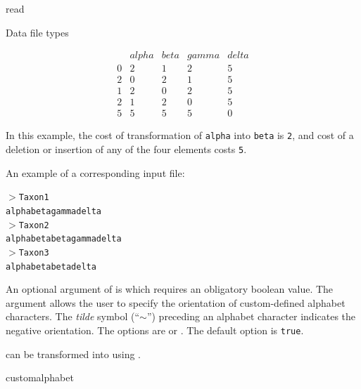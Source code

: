 \begin{command}{read}{}
\begin{arguments}
\begin{argumentgroup}{Data file types}
{            \begin{equation*}
                \begin{array}{lllll}
                      & alpha & beta & gamma & delta \\
                    0 &     2 &    1 &     2 &     5 \\
                    2 &     0 &    2 &     1 &     5 \\
                    1 &     2 &    0 &     2 &     5 \\
                    2 &     1 &    2 &     0 &     5 \\
                    5 &     5 &    5 &     5 &     0
                 \end{array}
            \end{equation*} 

           In this example, the cost of transformation of \texttt{alpha} into \texttt{beta} is \texttt{2},
           and cost of a deletion or insertion of any of the four elements costs \texttt{5}.
           
           An example of a corresponding input file:
       
           \texttt{$>$Taxon1\\
	alphabetagammadelta\\
	$>$Taxon2\\
	alphabetabetagammadelta\\
	$>$Taxon3\\
	alphabetabetadelta}
	
	An optional argument of  is 
	 which requires an obligatory boolean value. The argument
	 allows the user to specify the orientation of custom-defined alphabet
	characters. The \emph{tilde} symbol (``$\sim$'') preceding an alphabet character indicates
	the negative orientation. The options are 
	or . The default option is \texttt{true}.
	
	
	can be transformed into  using .}
	 {customalphabet}
        

\end{argumentgroup}
\end{arguments}
\end{command}
